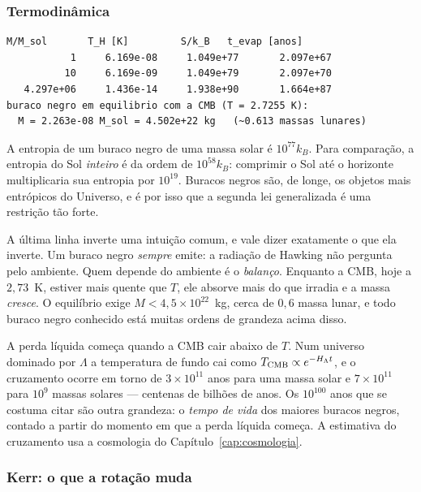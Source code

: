 \subsubsection*{Termodinâmica}

\begin{saida}
\begin{lstlisting}[style=rgsaida]
     M/M_sol       T_H [K]         S/k_B   t_evap [anos]
           1     6.169e-08     1.049e+77       2.097e+67
          10     6.169e-09     1.049e+79       2.097e+70
   4.297e+06     1.436e-14     1.938e+90       1.664e+87
buraco negro em equilibrio com a CMB (T = 2.7255 K):
  M = 2.263e-08 M_sol = 4.502e+22 kg   (~0.613 massas lunares)
\end{lstlisting}
\end{saida}

A entropia de um buraco negro de uma massa solar é $10^{77}k_{B}$. Para
comparação, a entropia do Sol \emph{inteiro} é da ordem de $10^{58}k_{B}$:
comprimir o Sol até o horizonte multiplicaria sua entropia por
$10^{19}$. Buracos negros são, de longe, os objetos mais entrópicos do
Universo, e é por isso que a segunda lei generalizada é uma restrição tão
forte.

A última linha inverte uma intuição comum, e vale dizer exatamente o que ela
inverte. Um buraco negro \emph{sempre} emite: a radiação de Hawking não
pergunta pelo ambiente. Quem depende do ambiente é o \emph{balanço}. Enquanto
a CMB, hoje a $2{,}73$~K, estiver mais quente que $T$, ele absorve mais do que
irradia e a massa \emph{cresce}. O equilíbrio exige
$M < 4{,}5\times10^{22}$~kg, cerca de $0{,}6$ massa lunar, e todo buraco negro
conhecido está muitas ordens de grandeza acima disso.

A perda líquida começa quando a CMB cair abaixo de $T$. Num universo dominado
por $\Lambda$ a temperatura de fundo cai como
$T_{\rm CMB}\propto e^{-H_\Lambda t}$, e o cruzamento ocorre em torno de
$3\times10^{11}$ anos para uma massa solar e $7\times10^{11}$ para $10^{9}$
massas solares --- centenas de bilhões de anos. Os $10^{100}$ anos que se
costuma citar são outra grandeza: o \emph{tempo de vida} dos maiores buracos
negros, contado a partir do momento em que a perda líquida começa. A
estimativa do cruzamento usa a cosmologia do
Capítulo~\ref{cap:cosmologia}.

\subsubsection*{Kerr: o que a rotação muda}

